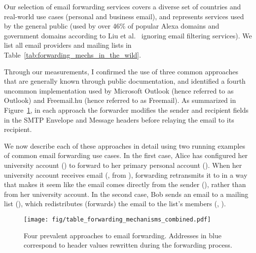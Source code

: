 Our selection of email forwarding services covers a diverse set of countries and real-world use cases (personal and business email), and represents services used by the general public (used by over 46\% of popular Alexa domains and government domains according to Liu et al.~\cite{liu2021s} ignoring email filtering services).
We list all email providers and mailing lists in Table~\ref{tab:forwarding_mechs_in_the_wild}.


Through our measurements, I confirmed the use of three common
approaches that are generally known through public documentation, and
identified a fourth uncommon implementation used by
Microsoft Outlook (hence referred to as Outlook) and Freemail.hu (hence referred to as Freemail).
As summarized in
Figure~\ref{fig:forwarding_mechs_combined}, in each approach the
forwarder modifies the sender and recipient fields in the SMTP
Envelope and Message headers before relaying the email to its
recipient.




We now describe each of these approaches in detail using two running
examples of common email forwarding use cases.  In the first case,
Alice has configured her university account () to
forward to her primary personal account ().  When
her university account receives email (\eg, from
), forwarding retransmits it to
 in a way that makes it seem like the email comes
directly from the sender (), rather than from her
university account.  In the second case, Bob sends an email to a
mailing list (), which redistributes (forwards) the
email to the list's members (\eg, ).


\begin{figure}[t]
  \centering
    \texttt{[image: fig/table\_forwarding\_mechanisms\_combined.pdf]}
    \caption[Four Prevalent Approaches to Email Forwarding]{Four prevalent approaches to email forwarding.  Addresses
      in blue correspond to header values rewritten during the
      forwarding process.
      }
    \label{fig:forwarding_mechs_combined}
\end{figure}


